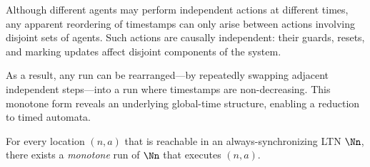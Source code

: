 Although different agents may perform independent actions at different
times, any apparent reordering of timestamps can only arise between
actions involving disjoint sets of agents.
Such actions are causally independent: their guards, resets, and marking
updates affect disjoint components of the system.

As a result, any run can be rearranged—by repeatedly swapping adjacent
independent steps—into a run where timestamps are non-decreasing.
This monotone form reveals an underlying global-time structure,
enabling a reduction to timed automata.

\begin{lemma}
\label{lem:monotonic}
For every location $(n,a)$ that is reachable in an always-synchronizing LTN
$\Nn$, there exists a \emph{monotone} run of $\Nn$ that executes $(n,a)$.
\end{lemma}

